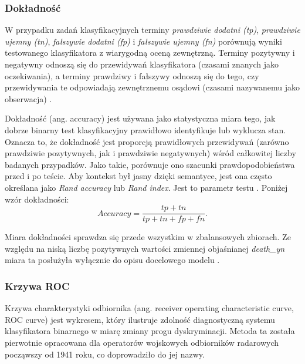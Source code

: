 \documentclass[polish, twoside, 12pt, a4paper]{article}
\theoremstyle{definition}
\theoremstyle{plain}
\theoremstyle{remark}
\begin{document}
\subsubsection{Dokładność}

W przypadku zadań klasyfikacyjnych terminy \emph{prawdziwie dodatni (tp)}, \emph{prawdziwie ujemny (tn)}, \emph{fałszywie dodatni (fp)} i \emph{fałszywie ujemny (fn)} porównują wyniki testowanego klasyfikatora z wiarygodną oceną zewnętrzną. Terminy pozytywny i negatywny odnoszą się do przewidywań klasyfikatora (czasami znanych jako oczekiwania), a terminy prawdziwy i fałszywy odnoszą się do tego, czy przewidywania te odpowiadają zewnętrznemu osądowi (czasami nazywanemu jako obserwacja) \citep{fawcett2005}.

Dokładność (ang. accuracy) jest używana jako statystyczna miara tego, jak dobrze binarny test klasyfikacyjny prawidłowo identyfikuje lub wyklucza stan. Oznacza to, że dokładność jest proporcją prawidłowych przewidywań (zarówno prawdziwie pozytywnych, jak i prawdziwie negatywnych) wśród całkowitej liczby badanych przypadków. Jako takie, porównuje ono szacunki prawdopodobieństwa przed i po teście. Aby kontekst był jasny dzięki semantyce, jest ona często określana jako \emph{Rand accuracy} lub \emph{Rand index}. Jest to parametr testu \citep{powers2015}. Poniżej wzór dokładności:
\[ Accuracy = \frac{tp + tn}{tp + tn + fp + fn}. \]

Miara dokładności sprawdza się przede wszystkim w zbalansowych zbiorach. Ze względu na niską liczbę pozytywnych wartości zmiennej objaśnianej \emph{death\_yn} miara ta posłużyła wyłącznie do opisu docelowego modelu \citep{tharwat2018}.



\subsubsection{Krzywa ROC}

Krzywa charakterystyki odbiornika (ang. receiver operating characteristic curve, ROC curve) jest wykresem, który ilustruje zdolność diagnostyczną systemu klasyfikatora binarnego w miarę zmiany progu dyskryminacji. Metoda ta została pierwotnie opracowana dla operatorów wojskowych odbiorników radarowych począwszy od 1941 roku, co doprowadziło do jej nazwy.
\end{document}
